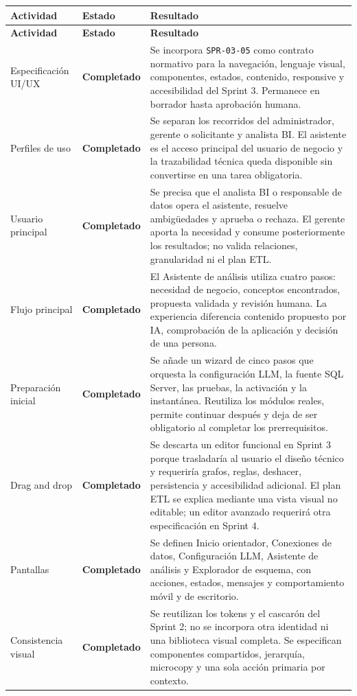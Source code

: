 \documentclass[11pt,letterpaper]{article}
\newcommand{\statusok}{\textcolor{deepgreen}{\textbf{Completado}}}
\newcommand{\file}[1]{\texttt{#1}}
\begin{document}
\begin{longtable}{@{}p{}p{}p{}@{}}
  \toprule
  \textbf{Actividad} & \textbf{Estado} & \textbf{Resultado} \\
  \midrule
  \endfirsthead
  \toprule
  \textbf{Actividad} & \textbf{Estado} & \textbf{Resultado} \\
  \midrule
  \endhead
  Especificación UI/UX & \statusok & Se incorpora \file{SPR-03-05} como contrato normativo para la navegación, lenguaje visual, componentes, estados, contenido, responsive y accesibilidad del Sprint 3. Permanece en borrador hasta aprobación humana. \\
  Perfiles de uso & \statusok & Se separan los recorridos del administrador, gerente o solicitante y analista BI. El asistente es el acceso principal del usuario de negocio y la trazabilidad técnica queda disponible sin convertirse en una tarea obligatoria. \\
  Usuario principal & \statusok & Se precisa que el analista BI o responsable de datos opera el asistente, resuelve ambigüedades y aprueba o rechaza. El gerente aporta la necesidad y consume posteriormente los resultados; no valida relaciones, granularidad ni el plan ETL. \\
  Flujo principal & \statusok & El Asistente de análisis utiliza cuatro pasos: necesidad de negocio, conceptos encontrados, propuesta validada y revisión humana. La experiencia diferencia contenido propuesto por IA, comprobación de la aplicación y decisión de una persona. \\
  Preparación inicial & \statusok & Se añade un wizard de cinco pasos que orquesta la configuración LLM, la fuente SQL Server, las pruebas, la activación y la instantánea. Reutiliza los módulos reales, permite continuar después y deja de ser obligatorio al completar los prerrequisitos. \\
  Drag and drop & \statusok & Se descarta un editor funcional en Sprint 3 porque trasladaría al usuario el diseño técnico y requeriría grafos, reglas, deshacer, persistencia y accesibilidad adicional. El plan ETL se explica mediante una vista visual no editable; un editor avanzado requerirá otra especificación en Sprint 4. \\
  Pantallas & \statusok & Se definen Inicio orientador, Conexiones de datos, Configuración LLM, Asistente de análisis y Explorador de esquema, con acciones, estados, mensajes y comportamiento móvil y de escritorio. \\
  Consistencia visual & \statusok & Se reutilizan los tokens y el cascarón del Sprint 2; no se incorpora otra identidad ni una biblioteca visual completa. Se especifican componentes compartidos, jerarquía, microcopy y una sola acción primaria por contexto. \\

\end{longtable}
\end{document}
